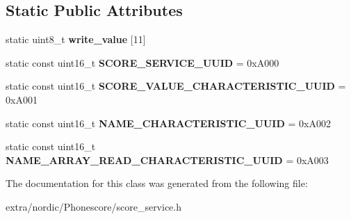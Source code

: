 \subsection*{Static Public Attributes}
\begin{DoxyCompactItemize}
\item 
\hypertarget{class_score_service_af4c9626b6377caed7796e37560240924}{}\label{class_score_service_af4c9626b6377caed7796e37560240924} 
static uint8\+\_\+t {\bfseries write\+\_\+value} \mbox{[}11\mbox{]}
\item 
\hypertarget{class_score_service_a13f8d9c27728800e17640d5766e10be2}{}\label{class_score_service_a13f8d9c27728800e17640d5766e10be2} 
static const uint16\+\_\+t {\bfseries S\+C\+O\+R\+E\+\_\+\+S\+E\+R\+V\+I\+C\+E\+\_\+\+U\+U\+ID} = 0x\+A000
\item 
\hypertarget{class_score_service_ad43ec951de215514328c6fe116dad6f1}{}\label{class_score_service_ad43ec951de215514328c6fe116dad6f1} 
static const uint16\+\_\+t {\bfseries S\+C\+O\+R\+E\+\_\+\+V\+A\+L\+U\+E\+\_\+\+C\+H\+A\+R\+A\+C\+T\+E\+R\+I\+S\+T\+I\+C\+\_\+\+U\+U\+ID} = 0x\+A001
\item 
\hypertarget{class_score_service_a982473e4d58ba3ea52fa8bbf8acae8ec}{}\label{class_score_service_a982473e4d58ba3ea52fa8bbf8acae8ec} 
static const uint16\+\_\+t {\bfseries N\+A\+M\+E\+\_\+\+C\+H\+A\+R\+A\+C\+T\+E\+R\+I\+S\+T\+I\+C\+\_\+\+U\+U\+ID} = 0x\+A002
\item 
\hypertarget{class_score_service_a81f03557a717ea3a4afe93e93ba87cd6}{}\label{class_score_service_a81f03557a717ea3a4afe93e93ba87cd6} 
static const uint16\+\_\+t {\bfseries N\+A\+M\+E\+\_\+\+A\+R\+R\+A\+Y\+\_\+\+R\+E\+A\+D\+\_\+\+C\+H\+A\+R\+A\+C\+T\+E\+R\+I\+S\+T\+I\+C\+\_\+\+U\+U\+ID} = 0x\+A003
\end{DoxyCompactItemize}


The documentation for this class was generated from the following file\+:\begin{DoxyCompactItemize}
\item 
extra/nordic/\+Phonescore/score\+\_\+service.\+h\end{DoxyCompactItemize}
